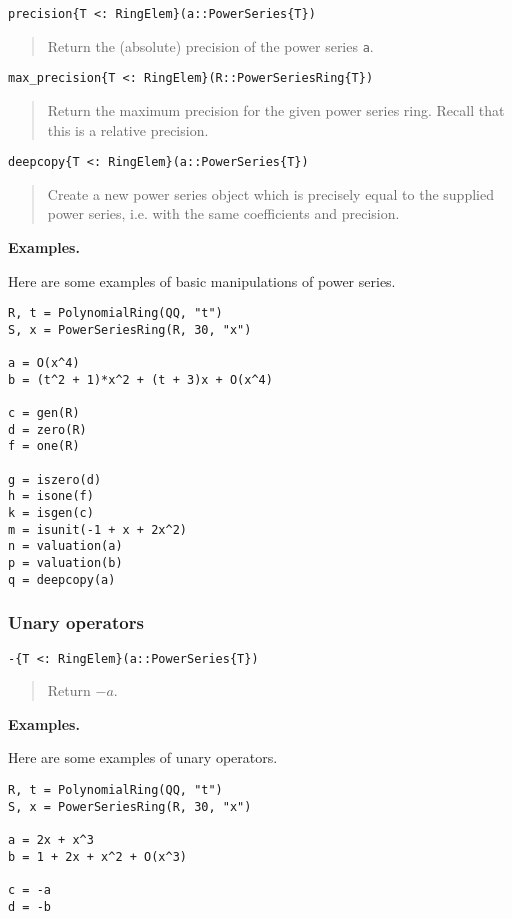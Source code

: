 \documentclass[a4paper,10pt]{article}
\newcommand{\code}{\lstinline}
\newcommand{\desc}[1]{\vspace{-3mm}\begin{quote}#1\end{quote}}
\begin{document}
\begin{lstlisting}
precision{T <: RingElem}(a::PowerSeries{T})
\end{lstlisting}

\desc{Return the (absolute) precision of the power series \code{a}.}

\begin{lstlisting}
max_precision{T <: RingElem}(R::PowerSeriesRing{T})
\end{lstlisting}

\desc{Return the maximum precision for the given power series ring. Recall
that this is a relative precision.}

\begin{lstlisting}
deepcopy{T <: RingElem}(a::PowerSeries{T})
\end{lstlisting}

\desc{Create a new power series object which is precisely equal to the
supplied power series, i.e. with the same coefficients and precision.}

\textbf{Examples.}

Here are some examples of basic manipulations of power series.

\begin{lstlisting}
R, t = PolynomialRing(QQ, "t")
S, x = PowerSeriesRing(R, 30, "x")

a = O(x^4)
b = (t^2 + 1)*x^2 + (t + 3)x + O(x^4)

c = gen(R)
d = zero(R)
f = one(R)

g = iszero(d)
h = isone(f)
k = isgen(c)
m = isunit(-1 + x + 2x^2)
n = valuation(a)
p = valuation(b)
q = deepcopy(a)
\end{lstlisting}

\subsubsection{Unary operators}

\begin{lstlisting}
-{T <: RingElem}(a::PowerSeries{T})
\end{lstlisting}

\desc{Return $-a$.}

\textbf{Examples.}

Here are some examples of unary operators.

\begin{lstlisting}
R, t = PolynomialRing(QQ, "t")
S, x = PowerSeriesRing(R, 30, "x")

a = 2x + x^3
b = 1 + 2x + x^2 + O(x^3)

c = -a
d = -b
\end{lstlisting}
\end{document}
